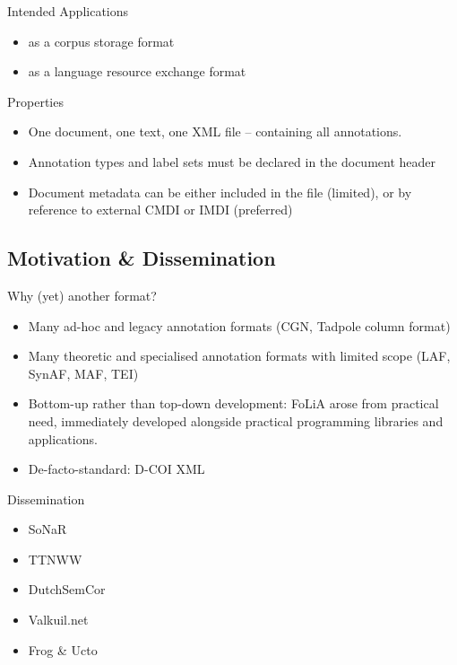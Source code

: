 \documentclass[compress,10pt]{beamer}
\begin{document}
\begin{frame}

	\begin{block}{Intended Applications}
		\begin{itemize}
			\item as a corpus storage format
			\item as a language resource exchange format 
		\end{itemize}				
	\end{block}

	\begin{block}{Properties}
		\begin{itemize}	
			\item One document, one text, one XML file -- containing all annotations.
			\item Annotation types and label sets must be declared in the document header
			\item Document metadata can be either included in the file (limited), or by reference to external CMDI or IMDI (preferred)
		\end{itemize}
	\end{block}
	
	
\end{frame}	
	
\subsection{Motivation \& Dissemination}	
	
\begin{frame}
	\begin{block}{Why (yet) another format?}
		\begin{itemize}
			\item Many ad-hoc and legacy annotation formats (CGN, Tadpole column format)
			\item Many theoretic and specialised annotation formats with limited scope (LAF, SynAF, MAF, TEI)
			\item Bottom-up rather than top-down development: FoLiA arose from practical need, immediately developed alongside practical programming libraries and applications. 
			\item De-facto-standard: D-COI XML
		\end{itemize}
	\end{block}
	
	\begin{block}{Dissemination}
		\begin{itemize}	
			\item SoNaR
			\item TTNWW
			\item DutchSemCor
			\item Valkuil.net
			\item Frog \& Ucto
		\end{itemize}			
	\end{block}

\end{frame}
   
\end{document}
